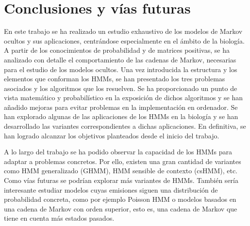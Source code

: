 \chapter*{Conclusiones y vías futuras}

En este trabajo se ha realizado un estudio exhaustivo de los modelos de Markov ocultos y sus aplicaciones, centrándose especialmente en el ámbito de la biología. A partir de los conocimientos de probabilidad y de matrices positivas, se ha analizado con detalle el comportamiento de las cadenas de Markov, necesarias para el estudio de los modelos ocultos. Una vez introducida la estructura y los elementos que conforman los HMMs, se han presentado los tres problemas asociados y los algoritmos que los resuelven. Se ha proporcionado un punto de vista matemático y probabilístico en la exposición de dichos algoritmos y se han añadido mejoras para evitar problemas en la implementación en ordenador. Se han explorado algunas de las aplicaciones de los HMMs en la biología y se han desarrollado las variantes correspondientes a dichas aplicaciones. En definitiva, se han logrado alcanzar los objetivos planteados desde el inicio del trabajo.

A lo largo del trabajo se ha podido observar la capacidad de los HMMs para adaptar a problemas concretos. Por ello, existen una gran cantidad de variantes como HMM generalizado (GHMM), HMM sensible de contexto (csHMM), etc. Como vías futuras se podrían explorar más variantes de HMMs. También sería interesante estudiar modelos cuyas emisiones siguen una distribución de probabilidad concreta, como por ejemplo Poisson HMM o modelos basados en una cadena de Markov con orden superior, esto es, una cadena de Markov que tiene en cuenta más estados pasados.